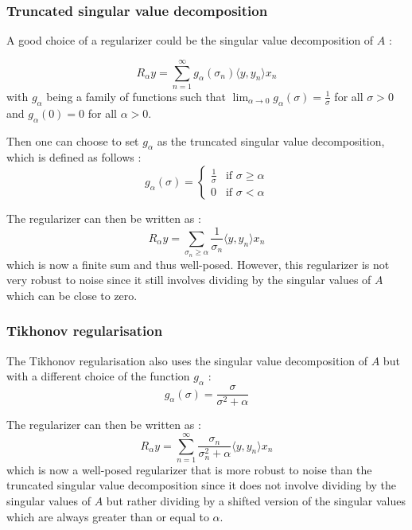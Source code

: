 \subsubsection{Truncated singular value decomposition}

A good choice of a regularizer could be the singular value decomposition of $A$ :

\begin{equation*}
    R_\alpha y = \sum_{n=1}^\infty g_\alpha(\sigma_n) \langle y, y_n \rangle x_n
\end{equation*}
with $g_\alpha$ being a family of functions such that $\lim_{\alpha \to 0} g_\alpha(\sigma) = \frac{1}{\sigma}$ for all $\sigma > 0$ and $g_\alpha(0) = 0$ for all $\alpha > 0$.

Then one can choose to set $g_\alpha$ as the truncated singular value decomposition, which is defined as follows :
\begin{equation*}
    g_\alpha(\sigma) = \begin{cases}
        \frac{1}{\sigma} & \text{if } \sigma \geq \alpha \\
        0 & \text{if } \sigma < \alpha
    \end{cases}
\end{equation*}

The regularizer can then be written as :
\begin{equation*}
    R_\alpha y = \sum_{\sigma_n \geq \alpha} \frac{1}{\sigma_n} \langle y, y_n \rangle x_n
\end{equation*}
which is now a finite sum and thus well-posed. However, this regularizer is not very robust to noise since it still involves dividing by the singular values of $A$ which can be close to zero.

\subsubsection{Tikhonov regularisation}

The Tikhonov regularisation also uses the singular value decomposition of $A$ but with a different choice of the function $g_\alpha$ :
\begin{equation*}
    g_\alpha(\sigma) = \frac{\sigma}{\sigma^2 + \alpha}
\end{equation*}

The regularizer can then be written as :
\begin{equation*}
    R_\alpha y = \sum_{n=1}^\infty \frac{\sigma_n}{\sigma_n^2 + \alpha} \langle y, y_n \rangle x_n
\end{equation*}
which is now a well-posed regularizer that is more robust to noise than the truncated singular value decomposition since it does not involve dividing by the singular values of $A$ but rather dividing by a shifted version of the singular values which are always greater than or equal to $\alpha$.



